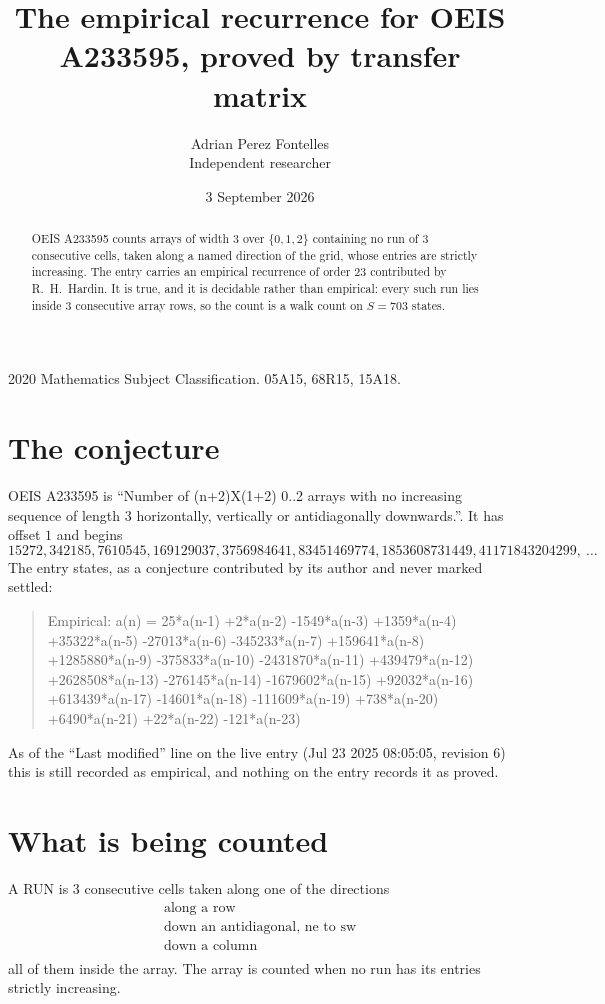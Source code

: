 \documentclass[11pt,a4paper]{article}
\title{The empirical recurrence for OEIS A233595, proved by transfer matrix}
\author{Adrian Perez Fontelles\\ \small Independent researcher}
\date{3 September 2026}
\theoremstyle{plain}
\theoremstyle{definition}
\begin{document}
\maketitle

\begin{abstract}
OEIS A233595 counts arrays of width $3$ over $\{0,1,2\}$ containing no run of $3$ consecutive
cells, taken along a named direction of the grid, whose entries are strictly increasing. The entry carries
an empirical recurrence of order $23$ contributed by R.~H.~Hardin. It is true, and it is
decidable rather than empirical: every such run lies inside $3$ consecutive array rows, so
the count is a walk count on $S=703$ states.
\end{abstract}

\noindent\small 2020 Mathematics Subject Classification. 05A15, 68R15, 15A18.\normalsize

\section{The conjecture}

OEIS A233595 is ``Number of (n+2)X(1+2) 0..2 arrays with no increasing sequence of length 3 horizontally, vertically or antidiagonally downwards.''. It has offset $1$ and begins
\[
15272, 342185, 7610545, 169129037, 3756984641, 83451469774, 1853608731449, 41171843204299,\ \dots
\]
The entry states, as a conjecture contributed by its author and never marked settled:
\begin{quote}
Empirical: a(n) = 25*a(n-1) +2*a(n-2) -1549*a(n-3) +1359*a(n-4) +35322*a(n-5) -27013*a(n-6) -345233*a(n-7) +159641*a(n-8) +1285880*a(n-9) -375833*a(n-10) -2431870*a(n-11) +439479*a(n-12) +2628508*a(n-13) -276145*a(n-14) -1679602*a(n-15) +92032*a(n-16) +613439*a(n-17) -14601*a(n-18) -111609*a(n-19) +738*a(n-20) +6490*a(n-21) +22*a(n-22) -121*a(n-23)
\end{quote}
As of the ``Last modified'' line on the live entry (Jul 23 2025 08:05:05, revision 6) this is still
recorded as empirical, and nothing on the entry records it as proved.

\section{What is being counted}

A RUN is $3$ consecutive cells taken along one of the directions
\[
\begin{array}{l}
\text{along a row} \\
\text{down an antidiagonal, ne to sw} \\
\text{down a column} \\
\end{array}
\]
all of them inside the array. The array is counted when no run has its entries strictly increasing.
\end{document}
